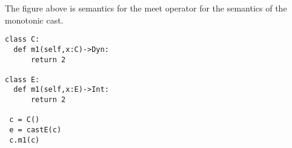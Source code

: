 \documentclass[a4paper,UKenglish,final]{tex/lipics-v2016}
\begin{document}
\begin{mathpar}





\end{mathpar}

\hrulefill

\opdef{
  $\meett{\P, \K, {\Type{\b\mt}}, {\Type{\b\mt}}} = {\Type{\b\mt}}~\K$
}{
}

\begin{mathpar}

\end{mathpar}

\hrulefill

The figure above is semantics for the meet operator for the semantics of the monotonic cast.

\begin{verbatim}
class C:
  def m1(self,x:C)->Dyn:
      return 2

class E:
  def m1(self,x:E)->Int:
      return 2

 c = C()
 e = castE(c)
 c.m1(c)
\end{verbatim}
\end{document}
